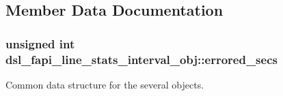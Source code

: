 \subsection{Member Data Documentation}
\hypertarget{structdsl__fapi__line__stats__interval__obj_ab7bf52b973364ae7b0c254ef31ab18a8}{
\subsubsection[{errored\-\_\-secs}]{\setlength{\rightskip}{0pt plus 5cm}unsigned int dsl\-\_\-fapi\-\_\-line\-\_\-stats\-\_\-interval\-\_\-obj\-::errored\-\_\-secs}}\label{structdsl__fapi__line__stats__interval__obj_ab7bf52b973364ae7b0c254ef31ab18a8}
Common data structure for the several objects.
